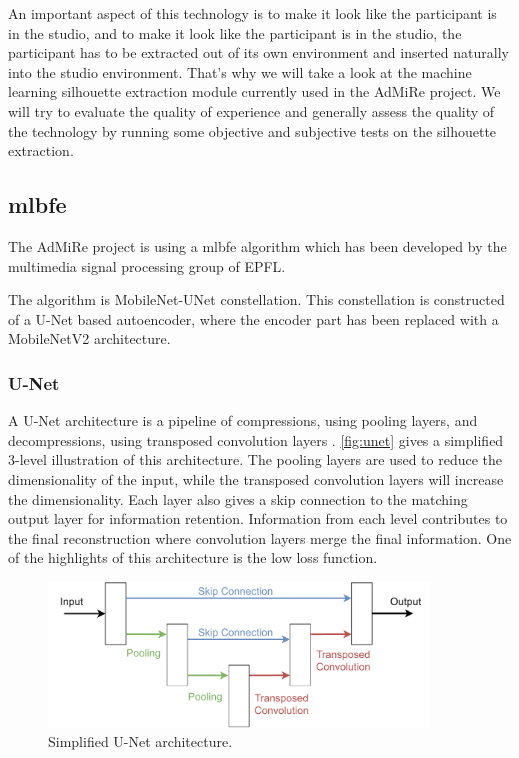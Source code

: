 An important aspect of this technology is to make it look like the participant is in the studio, and to make it look like the participant is in the studio, the participant has to be extracted out of its own environment and inserted naturally into the studio environment. That's why we will take a look at the machine learning silhouette extraction module currently used in the AdMiRe project. We will try to evaluate the quality of experience and generally assess the quality of the technology by running some objective and subjective tests on the silhouette extraction. 


\subsection{\acrlong{mlbfe}}\label{sec:mlbfe}
The AdMiRe project is using a \acrlong{mlbfe} algorithm which has been developed by the multimedia signal processing group of EPFL. 

The algorithm is MobileNet-UNet constellation. This constellation is constructed of a U-Net based autoencoder, where the encoder part has been replaced with a MobileNetV2 architecture. 

\subsubsection{U-Net}\label{sec:unet}
A U-Net architecture is a pipeline of compressions, using pooling layers, and decompressions, using transposed convolution layers \cite{ronneberger2015unet}. \autoref{fig:unet} gives a simplified 3-level illustration of this architecture. The pooling layers are used to reduce the dimensionality of the input, while the transposed convolution layers will increase the dimensionality. Each layer also gives a skip connection to the matching output layer for information retention. Information from each level contributes to the final reconstruction where convolution layers merge the final information. One of the highlights of this architecture is the low loss function.  

\begin{figure}[H]
  \centering
  \includegraphics[width=0.9\textwidth]{img/ML/unet.pdf}
  \caption{Simplified U-Net architecture. }
  \label{fig:unet}
\end{figure}

